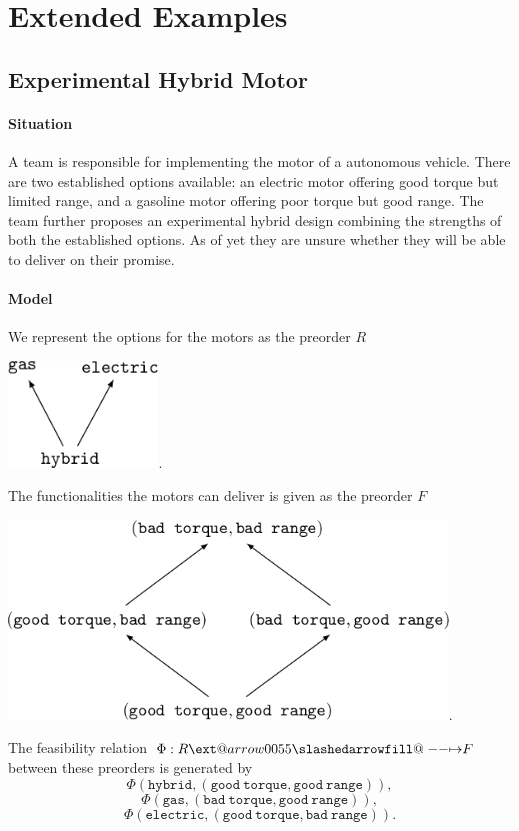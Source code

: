 \documentclass[12pt]{article}
\makeatletter
\theoremstyle{definition}
\theoremstyle{plain}
\theoremstyle{plain}
\theoremstyle{plain}
\theoremstyle{plain}
\theoremstyle{remark}
\theoremstyle{remark}
\def\slashedarrowfill@#1#2#3#4#5{%
	$\m@th\thickmuskip0mu\medmuskip\thickmuskip\thinmuskip\thickmuskip
	\relax#5#1\mkern-7mu%
	\cleaders\hbox{$#5\mkern-2mu#2\mkern-2mu$}\hfill
	\mathclap{#3}\mathclap{#2}%
	\cleaders\hbox{$#5\mkern-2mu#2\mkern-2mu$}\hfill
	\mkern-7mu#4$%
}
\def\rightslashedarrowfill@{%
	\slashedarrowfill@\relbar\relbar\mapstochar\rightarrow}
\newcommand\xslashedrightarrow[2][]{%
	\ext@arrow 0055{\rightslashedarrowfill@}{#1}{#2}}
\makeatother
\begin{document}
\section{Extended Examples}

\subsection{Experimental Hybrid Motor}
\paragraph{Situation} A team is responsible for implementing the motor of a autonomous vehicle. There are two established options available: an electric motor offering good torque but limited range, and a gasoline motor offering poor torque but good range. The team further proposes an experimental hybrid design combining the strengths of both the established options. As of yet they are unsure whether they will be able to deliver on their promise.

\paragraph{Model}
We represent the options for the motors as the preorder $R$
\begin{center}
	\includegraphics[height=80pt]{section6/6.1/motors.png}.
\end{center}
The functionalities the motors can deliver is given as the preorder $F$
\begin{center}
	\includegraphics[height=150pt]{section6/6.1/outputs.png}.
\end{center}
The feasibility relation $\Phi: R \xslashedrightarrow{} F$ between these preorders is generated by 
$$\Phi(\mathtt{hybrid},\mathtt{(good\ torque, good\ range)}),$$
$$\Phi(\mathtt{gas},\mathtt{(bad\ torque, good\ range)}),$$
$$\Phi(\mathtt{electric},\mathtt{(good\ torque, bad\ range)}).$$
\end{document}
